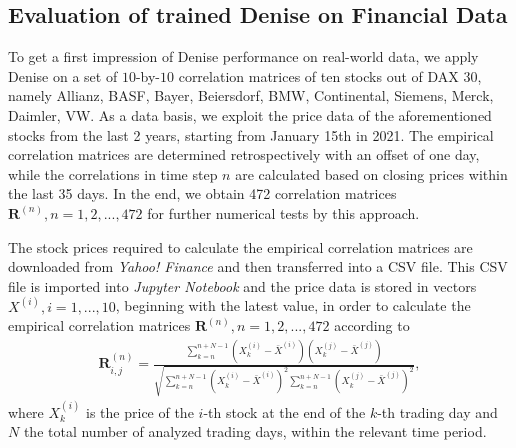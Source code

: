 \subsection{Evaluation of trained Denise on Financial Data}
To get a first impression of Denise performance on real-world data, we apply Denise on a set of $10$-by-$10$ correlation matrices of ten stocks out of DAX 30, namely Allianz, BASF, Bayer, Beiersdorf, BMW, Continental, Siemens, Merck, Daimler, VW. As a data basis, we exploit the price data of the aforementioned stocks from the last 2 years, starting from January 15th in 2021. The empirical correlation matrices are determined retrospectively with an offset of one day, while the correlations in time step $n$ are calculated based on closing prices within the last 35 days. In the end, we obtain 472 correlation matrices $\mathbf{R}^{(n)}, n = 1, 2, ... , 472 $ for further numerical tests by this approach.
\par
The stock prices required to calculate the empirical correlation matrices are downloaded from \textit{Yahoo! Finance} and then transferred into a CSV file. This CSV file is imported into \textit{Jupyter Notebook} and the price data is stored in vectors $X^{(i)}, i = 1, ... , 10$, beginning with the latest value, in order to calculate the empirical correlation matrices $\mathbf{R}^{(n)}, n = 1, 2, ... , 472 $ according to 
\begin{align}
\mathbf{R}_{i,j}^{(n)} = \frac{\sum_{k=n}^{n+N-1} (X_{k}^{(i)} - \bar{X}^{(i)}) (X_{k}^{(j)} - \bar{X}^{(j)})}{\sqrt{\sum_{k=n}^{n+N-1} (X_{k}^{(i)} - \bar{X}^{(i)})^{2} \sum_{k=n}^{n+N-1}(X_{k}^{(j)} - \bar{X}^{(j)})^{2}}},
\end{align}
where $X_{k}^{(i)}$ is the price of the $i$-th stock at the end of the $k$-th trading day and $N$ the total number of analyzed trading days, within the relevant time period.

